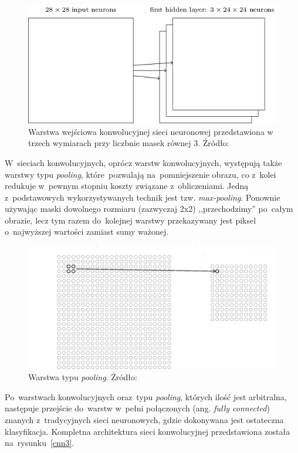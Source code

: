 \begin{figure}[ht!]
\centering
\includegraphics[scale=0.6]{res/cnn2.png}
\caption[Caption for LOF]{Warstwa wejściowa konwolucyjnej sieci neuronowej przedstawiona w trzech wymiarach przy liczbnie masek równej 3. Źródło:\cite{nielsen}\label{cnn2}} 
\end{figure}
\noindent
W~sieciach konwolucyjnych, oprócz warstw konwolucyjnych, występują także warstwy typu \textit{pooling}, które~pozwalają na~pomniejszenie obrazu, co z~kolei redukuje w~pewnym stopniu koszty związane z~obliczeniami. Jedną z~podstawowych wykorzystywanych technik jest tzw. \textit{max-pooling}. Ponownie używając maski dowolnego rozmiaru (zazwyczaj 2x2) ,,przechodzimy'' po~całym obrazie, lecz tym razem do~kolejnej warstwy przekazywany jest piksel o~najwyższej wartości zamiast sumy ważonej.
\begin{figure}[ht!]
\centering
\includegraphics[scale=0.6]{res/pooling.png}
\caption[Caption for LOF]{Warstwa typu \textit{pooling}. Źródło:\cite{nielsen}\label{pooling}} 
\end{figure}
\noindent
Po~warstwach konwolucyjnych oraz~typu \textit{pooling}, których ilość jest arbitralna, następuje przejście do~warstw w~pełni połączonych (ang. \textit{fully connected}) znanych z~tradycyjnych sieci neuronowych, gdzie dokonywana jest ostateczna klasyfikacja. Kompletna architektura sieci konwolucyjnej przedstawiona została na~rysunku~\ref{cnn3}.


